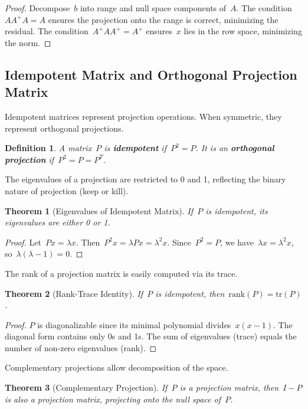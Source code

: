 \documentclass[12pt]{article}
\newtheorem{theorem}{Theorem}[section]
\newtheorem{definition}{Definition}[section]
\begin{document}
\begin{proof}
    Decompose~$b$ into range and null space components of~$A$. The condition~$A A^+ A = A$ ensures the projection onto the range is correct, minimizing the residual. The condition~$A^+ A A^+ = A^+$ ensures~$x$ lies in the row space, minimizing the norm.
\end{proof}

\subsection{Idempotent Matrix and Orthogonal Projection Matrix}

Idempotent matrices represent projection operations. When symmetric, they represent orthogonal projections.

\begin{definition}
    A matrix~$P$ is \textbf{idempotent} if~$P^2 = P$. It is an \textbf{orthogonal projection} if~$P^2 = P = P^T$.
\end{definition}

The eigenvalues of a projection are restricted to 0 and 1, reflecting the binary nature of projection (keep or kill).

\begin{theorem}[Eigenvalues of Idempotent Matrix]
    If~$P$ is idempotent, its eigenvalues are either 0 or 1.
\end{theorem}

\begin{proof}
    Let~$Px = \lambda x$. Then~$P^2 x = \lambda P x = \lambda^2 x$. Since~$P^2 = P$, we have~$\lambda x = \lambda^2 x$, so~$\lambda(\lambda - 1) = 0$.
\end{proof}

The rank of a projection matrix is easily computed via its trace.

\begin{theorem}[Rank-Trace Identity]
    If~$P$ is idempotent, then~$\text{rank}(P) = \text{tr}(P)$.
\end{theorem}

\begin{proof}
    $P$ is diagonalizable since its minimal polynomial divides~$x(x-1)$. The diagonal form contains only 0s and 1s. The sum of eigenvalues (trace) equals the number of non-zero eigenvalues (rank).
\end{proof}

Complementary projections allow decomposition of the space.

\begin{theorem}[Complementary Projection]
    If~$P$ is a projection matrix, then~$I - P$ is also a projection matrix, projecting onto the null space of~$P$.
\end{theorem}
\end{document}
